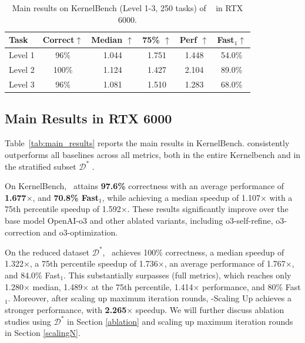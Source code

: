 \begin{table}[t]
\caption{Main results on KernelBench (Level 1-3, 250 tasks) of \agentname~ in RTX 6000.}
\label{tab:Level1-3}
\centering
\begin{tabular}{lccccc}
\toprule
\textbf{Task} & \textbf{Correct$\uparrow$} & \textbf{Median $\uparrow$}  & \textbf{75\% $\uparrow$}  & \textbf{Perf $\uparrow$}  & \textbf{Fast$_1$$\uparrow$} \\
\midrule
Level 1   & 96\% &  1.044 & 1.751 & 1.448 & 54.0\% \\
Level 2  & 100\% & 1.124 & 1.427 & 2.104 & 89.0\% \\
Level 3  & 96\% & 1.081& 1.510 & 1.283 & 68.0\% \\
\bottomrule
\end{tabular}
\end{table}

\subsection{Main Results in RTX 6000}
\label{sec:MainResults}
Table~\ref{tab:main_results} reports the main results in KernelBench. {\agentname} consistently outperforms all baselines across all metrics, both in the entire Kernelbench and in the stratified subset \(\mathcal{D}^{*}\) .


{On KernelBench, \agentname~attains \textbf{97.6\%} correctness with an average performance of \textbf{1.677$\times$}, and \textbf{70.8\% Fast$_1$}, while achieving a median speedup of 1.107$\times$ with a 75th percentile speedup of 1.592$\times$. These results significantly improve over the base model OpenAI-o3 and other ablated variants, including o3-self-refine, o3-correction and o3-optimization.}

{On the reduced dataset \(\mathcal{D}^{*}\), \agentname~achieves 100\% correctness, a median speedup of 1.322$\times$, a 75th percentile speedup of 1.736$\times$, an average performance of 1.767$\times$, and 84.0\% Fast$_1$.  
This substantially surpasses \agentname(full metrics), which reaches only 1.280$\times$ median, 1.489$\times$ at the 75th percentile, 1.414$\times$ performance, and 80\% Fast$_1$. Moreover, after scaling up maximum iteration rounds, \agentname-Scaling Up achieves a stronger performance, with \textbf{2.265$\times$} speedup. We will further discuss ablation studies using  \(\mathcal{D}^{*}\) in Section \ref{ablation} and scaling up maximum iteration rounds in Section \ref{scalingN}.}

